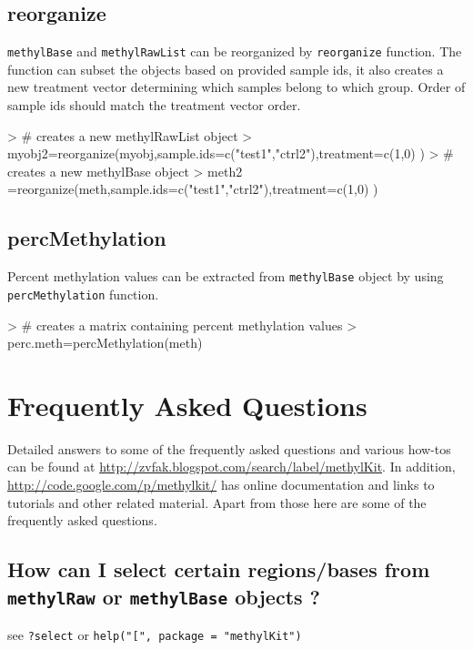 \documentclass{article}
\begin{document}
\subsection{reorganize}
\texttt{methylBase} and \texttt{methylRawList} can be reorganized by \texttt{reorganize} function. The function can subset the objects based on provided sample ids, it also creates a new treatment vector determining which samples belong to which group. Order of sample ids should match the treatment vector order.
\begin{Schunk}
\begin{Sinput}
> # creates a new methylRawList object
> myobj2=reorganize(myobj,sample.ids=c("test1","ctrl2"),treatment=c(1,0) )
> # creates a new methylBase object
> meth2 =reorganize(meth,sample.ids=c("test1","ctrl2"),treatment=c(1,0) )
\end{Sinput}
\end{Schunk}

\subsection{percMethylation}
Percent methylation values can be extracted from \texttt{methylBase} object by using \texttt{percMethylation} function.
\begin{Schunk}
\begin{Sinput}
> # creates a matrix containing percent methylation values
> perc.meth=percMethylation(meth)
\end{Sinput}
\end{Schunk}

\section{Frequently Asked Questions}
Detailed answers to some of the frequently asked questions and various how-tos 
can be found at \url{http://zvfak.blogspot.com/search/label/methylKit}. 
In addition, \url{http://code.google.com/p/methylkit/} has online documentation
and links to tutorials and other related material. Apart from those here are 
some of the frequently asked questions.

\subsection{How can I select certain regions/bases from \texttt{methylRaw} or \texttt{methylBase} objects ?}
see \texttt{?select} or \texttt{help("[", package = "methylKit")}
\end{document}
